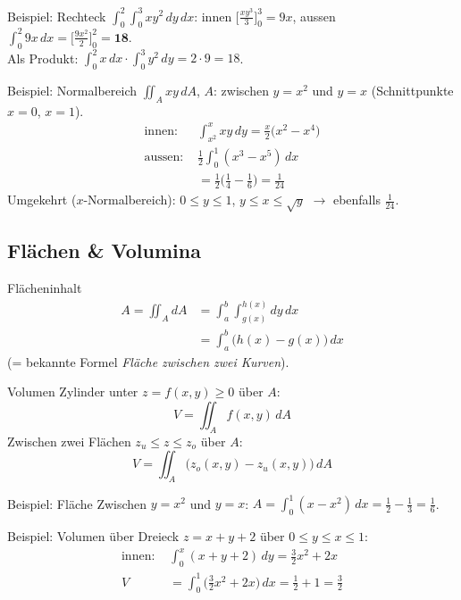 \documentclass[a4paper, fontsize=7pt]{scrartcl}
\begin{document}
\begin{subbox}{Beispiel: Rechteck}
$\int_0^2 \int_0^3 x y^2\, dy\, dx$: innen
$\big[\tfrac{x y^3}{3}\big]_0^3 = 9x$, aussen
$\int_0^2 9x\, dx = \big[\tfrac{9x^2}{2}\big]_0^2 = \mathbf{18}$.\\
Als Produkt: $\int_0^2 x\,dx \cdot \int_0^3 y^2\,dy = 2 \cdot 9 = 18$.
\end{subbox}

\begin{subbox}{Beispiel: Normalbereich}
$\iint_A xy\, dA$, $A$: zwischen $y = x^2$ und $y = x$ (Schnittpunkte
$x = 0$, $x = 1$).
\begin{align*}
\text{innen: } & \int_{x^2}^{x} xy\, dy
  = \tfrac{x}{2}\big(x^2 - x^4\big)\\
\text{aussen: } & \tfrac{1}{2} \int_0^1 (x^3 - x^5)\, dx\\
  &= \tfrac12\big(\tfrac14 - \tfrac16\big) = \tfrac{1}{24}
\end{align*}
Umgekehrt ($x$-Normalbereich): $0 \le y \le 1$, $y \le x \le \sqrt y$ $\to$
ebenfalls $\frac{1}{24}$.
\end{subbox}

\subsection{Flächen \& Volumina}

\begin{mainbox}{Flächeninhalt}
\begin{align*}
A = \iint_A dA &= \int_a^b \int_{g(x)}^{h(x)} dy\, dx\\
  &= \int_a^b \big(h(x) - g(x)\big)\, dx
\end{align*}
(= bekannte Formel \emph{Fläche zwischen zwei Kurven}).
\end{mainbox}

\begin{mainbox}{Volumen}
Zylinder unter $z = f(x, y) \ge 0$ über $A$:
$$V = \iint_A f(x, y)\, dA$$
Zwischen zwei Flächen $z_u \le z \le z_o$ über $A$:
$$V = \iint_A \big(z_o(x, y) - z_u(x, y)\big)\, dA$$
\end{mainbox}

\begin{subbox}{Beispiel: Fläche}
Zwischen $y = x^2$ und $y = x$:
$A = \int_0^1 (x - x^2)\, dx = \frac12 - \frac13 = \frac{1}{6}$.
\end{subbox}

\begin{subbox}{Beispiel: Volumen über Dreieck}
$z = x + y + 2$ über $0 \le y \le x \le 1$:
\begin{align*}
\text{innen: } & \int_0^x (x + y + 2)\, dy = \tfrac32 x^2 + 2x\\
V &= \int_0^1 \big(\tfrac32 x^2 + 2x\big)\, dx = \tfrac12 + 1
  = \tfrac{3}{2}
\end{align*}
\end{subbox}
\end{document}
